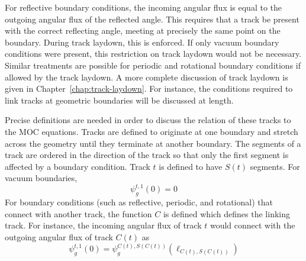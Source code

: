 For reflective boundary conditions, the incoming angular flux is equal to the outgoing angular flux of the reflected angle. This requires that a track be present with the correct reflecting angle, meeting at precisely the same point on the boundary. During track laydown, this is enforced. If only vacuum boundary conditions were present, this restriction on track laydown would not be necessary. Similar treatments are possible for periodic and rotational boundary conditions if allowed by the track laydown.  A more complete discussion of track laydown is given in Chapter~\ref{chap:track-laydown}. For instance, the conditions required to link tracks at geometric boundaries will be discussed at length.

Precise definitions are needed in order to discuss the relation of these tracks to the MOC equations. Tracks are defined to originate at one boundary and stretch across the geometry until they terminate at another boundary. The segments of a track are ordered in the direction of the track so that only the first segment is affected by a boundary condition. Track $t$ is defined to have $S(t)$ segments. For vacuum boundaries,
\begin{dmath}
	\psi_g^{t,1}(0) = 0
\end{dmath}
For boundary conditions (such as reflective, periodic, and rotational) that connect with another track, the function $C$ is defined which defines the linking track. For instance, the incoming angular flux of track $t$ would connect with the outgoing angular flux of track $C(t)$ as
\begin{dmath}
	\psi_g^{t,1}(0) = \psi_g^{C(t),S(C(t))}(\ell_{C(t),S(C(t))})
	\label{eqn:linking-bc}
\end{dmath}

